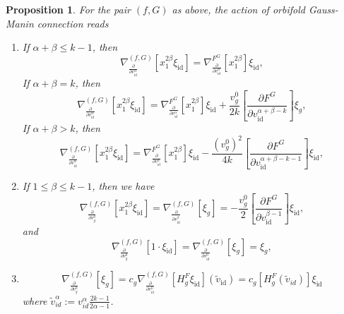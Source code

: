 \documentclass[reqno,12pt]{amsart}
\numberwithin{equation}{section}
\theoremstyle{plain}
\newtheorem{proposition}[theorem]{Proposition}
\def\p{\partial }
\theoremstyle{definition}
\newcommand{\id}{\mathrm{id}}
\numberwithin{equation}{section}
\begin{document}
\begin{proposition}{\label{EF2}}
    For the pair $(f,G)$ as above, the action of orbifold Gauss-Manin connection reads
\begin{enumerate}
\item 
If $\alpha+\beta \le k-1$, then
\[
\nabla_{\frac{\partial}{\partial v^\alpha_{\id}}}^{(f,G)}[x_1^{2\beta}\xi_{\id}] = \nabla^{F^G}_{\frac{\partial}{\partial v^\alpha_{\id}}}[x_1^{2\beta}]\xi_{\id},
\]
If $\alpha+\beta = k$, then
\[
\nabla_{\frac{\partial}{\partial v^\alpha_{\id}}}^{(f,G)}[x_1^{2\beta}\xi_{\id}] = \nabla^{F^G}_{\frac{\partial}{\partial v^\alpha_{\id}}}[x_1^{2\beta}]\xi_{\id} + \frac{v_g^0}{2k} \left[\frac{\p F^G}{\p v_\id^{\alpha+\beta-k}}\right]
\xi_{g},
\]
If $\alpha+\beta > k$, then
\[
\nabla_{\frac{\partial}{\partial v^\alpha_{\id}}}^{(f,G)}[x_1^{2\beta}\xi_{\id}] = \nabla^{F^G}_{\frac{\partial}{\partial v^\alpha_{\id}}}[x_1^{2\beta}]\xi_{\id} - \frac{(v_g^0)^2}{4k} 
\left[\frac{\p F^G}{\p v_\id^{\alpha+\beta-k-1}}\right]\xi_{\id},
\]



\item If $1 \le \beta \le k-1$, then we have
\[
\nabla_{\frac{\partial}{\partial v^0_{g}}}^{(f,G)}[x_1^{2\beta}\xi_{\id}] 
= \nabla_{\frac{\partial}{\partial v^\beta_{\id}}}^{(f,G)}[\xi_{g}] 
= - \frac{v_g^0}{2}\left[\frac{\partial F^G}{\partial v^{\beta-1}_{\id}}\right]\xi_{\id},
\]
and
\[
\nabla_{\frac{\partial}{\partial v^0_{g}}}^{(f,G)}[1 \cdot \xi_{\id}] 
= \nabla_{\frac{\partial}{\partial v^0_{\id}}}^{(f,G)}[\xi_{g}] 
= \xi_g,
\]


\item 
    \[
        \nabla_{\frac{\partial}{\partial v^0_{g}}}^{(f,G)}[\xi_{g}] = 
        c_g \nabla_{\frac{\partial}{\partial v^0_{\id}}}^{(f,G)}[H^F_g \xi_{\id}](\widetilde v_{\id}) = c_g[H^F_g (\widetilde v_{id})]\xi_{\id}
    \]
where $\widetilde v^{\alpha}_{id} := v^{\alpha}_{id} \frac{2k - 1}{2\alpha -1}$.  
\end{enumerate}
\end{proposition}
\end{document}
